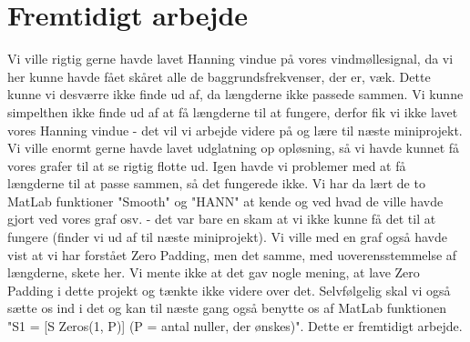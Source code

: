 \documentclass[12pt, letterpaper]{article}
\begin{document}
\begin{figure}[!h]
           \begin{floatrow}
       
           \end{floatrow}
\end{figure}

\newpage


\section{Fremtidigt arbejde}
Vi ville rigtig gerne havde lavet Hanning vindue på vores vindmøllesignal, da vi her kunne havde fået skåret alle de baggrundsfrekvenser, der er, væk. Dette kunne vi desværre ikke finde ud af, da længderne ikke passede sammen. Vi kunne simpelthen ikke finde ud af at få længderne til at fungere, derfor fik vi ikke lavet vores Hanning vindue - det vil vi arbejde videre på og lære til næste miniprojekt. 
Vi ville enormt gerne havde lavet udglatning op opløsning, så vi havde kunnet få vores grafer til at se rigtig flotte ud. Igen havde vi problemer med at få længderne til at passe sammen, så det fungerede ikke. 
Vi har da lært de to MatLab funktioner "Smooth" og "HANN" at kende og ved hvad de ville havde gjort ved vores graf osv. - det var bare en skam at vi ikke kunne få det til at fungere (finder vi ud af til næste miniprojekt). 
Vi ville med en graf også havde vist at vi har forstået Zero Padding, men det samme, med uoverensstemmelse af længderne, skete her. Vi mente ikke at det gav nogle mening, at lave Zero Padding i dette projekt og tænkte ikke videre over det. Selvfølgelig skal vi også sætte os ind i det og kan til næste gang også benytte os af MatLab funktionen "S1 = [S  Zeros(1, P)] (P = antal nuller, der ønskes)". 
Dette er fremtidigt arbejde. 
\end{document}
